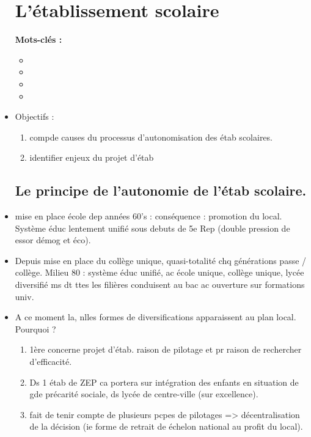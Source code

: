 \documentclass[12pt]{report}
\begin{document}
\begin{itemize}
\chapter{L'établissement scolaire}

\textbf{Mots-clés : } 

\begin{itemize}
\item 
\item 
\item 
\item   
\end{itemize}


\item Objectifs : 
\begin{enumerate}
\item compde causes du processus d'autonomisation des étab scolaires.  \\
\item identifier enjeux du projet d'étab \\
\end{enumerate}

\section{Le principe de l'autonomie de l'étab scolaire.}

 \item mise en place école dep années 60's : conséquence : promotion du local. Système éduc lentement unifié sous debuts de 5e Rep (double pression de essor démog et éco). \\
 
 \item Depuis mise en place du collège unique, quasi-totalité chq générations passe / collège. Milieu 80 : système éduc unifié, ac école unique, collège unique, lycée diversifié ms dt ttes les filières conduisent au bac ac ouverture sur formations univ.\\
 
 \item A ce moment la, nlles formes de diversifications apparaissent au plan local. Pourquoi ?
 \begin{enumerate}
 \item 1ère concerne projet d'étab. raison de pilotage et pr raison de rechercher d'efficacité. \\
 \item Ds 1 étab de ZEP ca portera sur intégration des enfants en situation de gde précarité sociale, ds lycée de centre-ville (sur excellence). \\
 \item fait de tenir compte de plusieurs pcpes de pilotages => décentralisation de la décision (ie forme de retrait de échelon national au profit du local).
 \end{enumerate}
 

\end{itemize}
\end{document}
